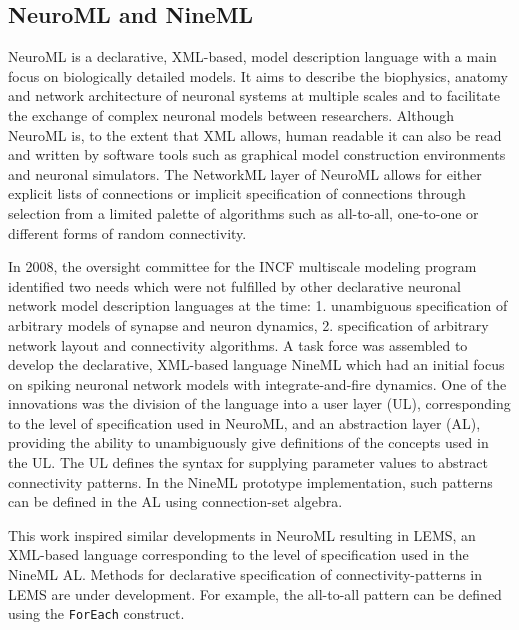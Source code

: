 \documentclass{frontiersSCNS} %
\begin{document}
\subsection{NeuroML and NineML}
NeuroML \citep{gleeson10,goddard01} is a declarative, XML-based, model
description language with a main focus on biologically detailed
models. It aims to describe the biophysics, anatomy and network
architecture of neuronal systems at multiple scales and to facilitate
the exchange of complex neuronal models between researchers. Although
NeuroML is, to the extent that XML allows, human readable it can also
be read and written by software tools such as
graphical model construction environments \citep{gleeson07} and
neuronal simulators. The NetworkML layer of NeuroML allows for either
explicit lists of connections or implicit specification of connections
through selection from a limited palette of algorithms such as
all-to-all, one-to-one or different forms of random connectivity.

In 2008, the oversight committee for the INCF multiscale modeling
program identified two needs which were not fulfilled by other
declarative neuronal network model description languages at the time:
1. unambiguous specification of arbitrary models of synapse and neuron
dynamics, 2. specification of arbitrary network layout and
connectivity algorithms.  A task force was assembled to develop the
declarative, XML-based language NineML \citep{raikov11} which had an
initial focus on spiking neuronal network models with
integrate-and-fire dynamics.  One of the innovations was the division
of the language into a user layer (UL), corresponding to the level of
specification used in NeuroML, and an abstraction layer (AL),
providing the ability to unambiguously give definitions of the
concepts used in the UL. The UL defines the syntax for supplying
parameter values to abstract connectivity patterns. In the NineML
prototype implementation, such patterns can be defined in the AL using
connection-set algebra.

This work inspired similar developments in NeuroML resulting in LEMS,
an XML-based language corresponding to the level of specification used
in the NineML AL.  Methods for declarative specification of
connectivity-patterns in LEMS are under development.  For example, the
all-to-all pattern can be defined using the \verb|ForEach| construct.
\end{document}
